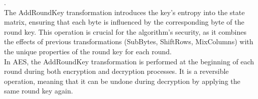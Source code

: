 \documentclass{report}
\begin{document}
.\\
The AddRoundKey transformation introduces the key's entropy into the state matrix, ensuring that each byte is influenced by the corresponding byte of the round key. This operation is crucial for the algorithm's security, as it combines the effects of previous transformations (SubBytes, ShiftRows, MixColumns) with the unique properties of the round key for each round.\\
In AES, the AddRoundKey transformation is performed at the beginning of each round during both encryption and decryption processes. It is a reversible operation, meaning that it can be undone during decryption by applying the same round key again.
\end{document}
